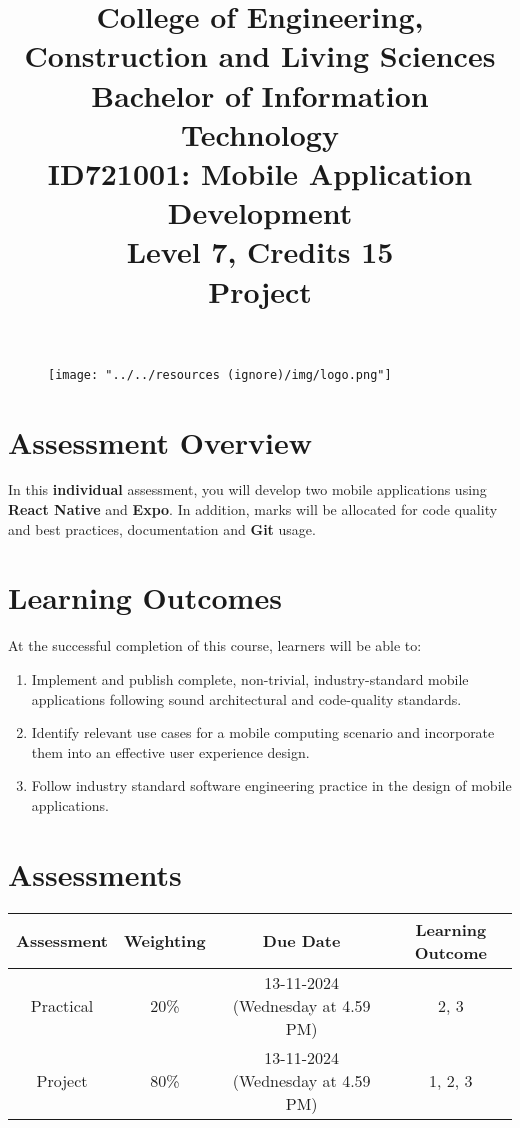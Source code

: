 \documentclass{article}
\author{}
\begin{document}
\begin{figure}
  \centering
  \texttt{[image: "../../resources (ignore)/img/logo.png"]}
\end{figure}

\title{College of Engineering, Construction and Living Sciences\\Bachelor of Information Technology\\ID721001: Mobile Application Development\\Level 7, Credits 15\\\textbf{Project}}
\date{}
\maketitle

\section*{Assessment Overview}
In this \textbf{individual} assessment, you will develop two mobile applications using \textbf{React Native} and \textbf{Expo}. In addition, marks will be allocated for code quality and best practices, documentation and \textbf{Git} usage. 

\section*{Learning Outcomes}
At the successful completion of this course, learners will be able to:
\begin{enumerate}
  \item Implement and publish complete, non-trivial, industry-standard mobile applications following sound architectural and code-quality standards.
  \item Identify relevant use cases for a mobile computing scenario and incorporate them into an effective user experience design.
  \item Follow industry standard software engineering practice in the design of mobile applications.
\end{enumerate}

\section*{Assessments}
\renewcommand{\arraystretch}{1.5}
\begin{tabular}{|c|c|c|c|}
  \hline
  \textbf{Assessment}                                 & \textbf{Weighting} & \textbf{Due Date}            & \textbf{Learning Outcome} \\ \hline
  \small Practical & \small 20\%        & \small 13-11-2024 (Wednesday at 4.59 PM)   & \small 2, 3                   \\ \hline
  \small Project                 & \small 80\%        & \small 13-11-2024 (Wednesday at 4.59 PM) \small  & \small 1, 2, 3                   \\ \hline
\end{tabular}
\end{document}
